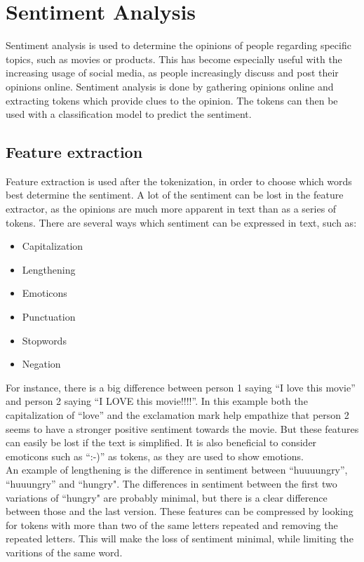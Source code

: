 \section{Sentiment Analysis}
Sentiment analysis is used to determine the opinions of people regarding
specific topics, such as movies or products. This has become especially useful
with the increasing usage of social media, as people increasingly discuss and
post their opinions online. Sentiment analysis is done by gathering opinions
online and extracting tokens which provide clues to the opinion. The tokens can
then be used with a classification model to predict the sentiment.

\subsection{Feature extraction} 
Feature extraction is used after the tokenization, in order to choose which
words best determine the sentiment. A lot of the sentiment can be lost in the
feature extractor, as the opinions are much more apparent in text than as a
series of tokens. There are several ways which sentiment can be expressed in
text, such as\citep[Ch.3-4]{Sentiment}:

\begin{itemize}
  \item Capitalization 
  \item Lengthening
  \item Emoticons
  \item Punctuation
  \item Stopwords
  \item Negation
\end{itemize}

For instance, there is a big difference between person 1 saying ``I love this
movie'' and person 2 saying ``I LOVE this movie!!!!''. In this example both the
capitalization of ``love'' and the exclamation mark help empathize that person
2 seems to have a stronger positive sentiment towards the movie. But these
features can easily be lost if the text is simplified. It is also beneficial to
consider emoticons such as ``:-)'' as tokens, as they are used to show
emotions.\\

An example of lengthening is the difference in sentiment between ``huuuungry'',
``huuungry'' and ``hungry". The differences in sentiment between the first two
variations of ``hungry" are probably minimal, but there is a clear difference
between those and the last version. These features can be compressed by looking
for tokens with more than two of the same letters repeated and removing the
repeated letters. This will make the loss of sentiment minimal, while limiting
the varitions of the same word.\nl

